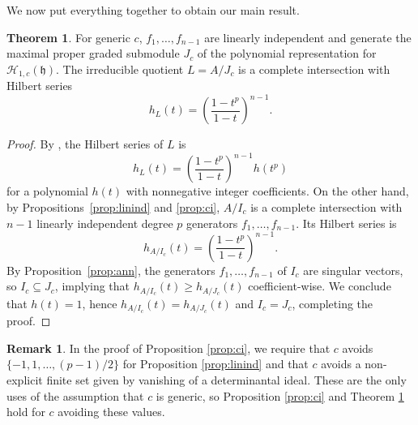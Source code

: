 \documentclass{amsart}
\numberwithin{equation}{section}
\theoremstyle{definition}
\newtheorem{theorem}{Theorem}[section]
\newtheorem*{remark}{Remark}
\newcommand{\h}{\mathfrak{h}}
\newcommand{\HH}{\mathcal{H}}
\begin{document}
We now put everything together to obtain our main result.

\begin{theorem}\label{thm:main}
For generic $c$, $f_1, \ldots, f_{n-1}$ are linearly independent and generate the maximal proper graded submodule $J_c$ of the polynomial representation for $\HH_{1, c}(\h)$.  The irreducible quotient $L = A/J_c$ is a complete intersection with Hilbert series 
\[
h_L(t) = \left(\frac{1-t^p}{1-t}\right)^{n-1}.
\]
\end{theorem}
\begin{proof}
By \cite[Proposition 3.4]{BC1}, the Hilbert series of $L$ is 
\[
h_L(t) = \left(\frac{1-t^p}{1-t}\right)^{n-1}h(t^p)
\]
for a polynomial $h(t)$ with nonnegative integer coefficients.  On the other hand, by Propositions~\ref{prop:linind} and \ref{prop:ci}, $A/I_c$ is a complete intersection with $n-1$ linearly independent degree $p$ generators $f_1, \ldots, f_{n-1}$. Its Hilbert series is
\[
h_{A/I_c}(t)=\left(\frac{1-t^p}{1-t}\right)^{n-1}.
\]
By Proposition~\ref{prop:ann}, the generators $f_1, \ldots, f_{n - 1}$ of $I_c$ are singular vectors, so $I_c \subseteq J_c$, implying that $h_{A/I_c}(t) \ge h_{A/J_c}(t)$ coefficient-wise.  We conclude that $h(t) = 1$, hence $h_{A/I_c}(t)=h_{A/J_c}(t)$ and $I_c=J_c$, completing the proof.
\end{proof}

\begin{remark}
In the proof of Proposition \ref{prop:ci}, we require that $c$ avoids $\{-1, 1,\dots,(p-1)/2\}$ for Proposition \ref{prop:linind} and that $c$ avoids a non-explicit finite set given by vanishing of a determinantal ideal.  These are the only uses of the assumption that $c$ is generic, so Proposition \ref{prop:ci} and Theorem \ref{thm:main} hold for $c$ avoiding these values.
\end{remark}




\end{document}

